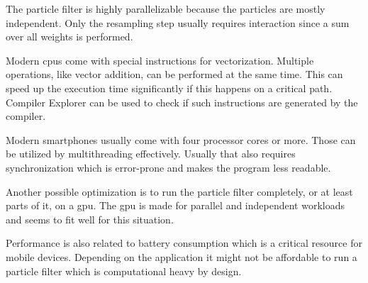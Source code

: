 The particle filter is highly parallelizable because the particles are mostly independent. Only the resampling step usually requires interaction since a sum over all weights is performed.\cite{parallel_resampling}

Modern \glspl{cpu} come with special instructions for vectorization. Multiple operations, like vector addition, can be performed at the same time. This can speed up the execution time significantly if this happens on a critical path. Compiler Explorer\cite{compiler_explorer} can be used to check if such instructions are generated by the compiler.

Modern smartphones usually come with four processor cores or more. Those can be utilized by multithreading effectively. Usually that also requires synchronization which is error-prone and makes the program less readable.

Another possible optimization is to run the particle filter completely, or at least parts of it, on a \gls{gpu}. The \gls{gpu} is made for parallel and independent workloads and seems to fit well for this situation.\cite{parallel_resampling}

Performance is also related to battery consumption which is a critical resource for mobile devices. Depending on the application it might not be affordable to run a particle filter which is computational heavy by design.
